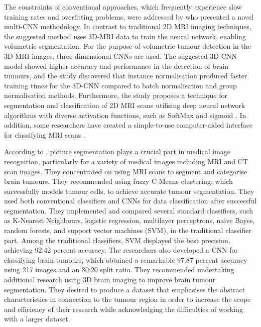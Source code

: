 \documentclass[12pt, a4paper,twoside]{report}
\theoremstyle{plain} %
\theoremstyle{definition} %
\theoremstyle{remark} %
\numberwithin{equation}{chapter}
\begin{document}
The constraints of conventional approaches, which frequently experience slow training rates and overfitting problems, were addressed by \cite{li19} who presented a novel multi-CNN methodology. In contrast to traditional 2D MRI imaging techniques, the suggested method uses 3D-MRI data to train the neural network, enabling volumetric segmentation. For the purpose of volumetric tumour detection in the 3D-MRI images, three-dimensional CNNs are used. The suggested 3D-CNN model showed higher accuracy and performance in the detection of brain tumours, and the study discovered that instance normalisation produced faster training times for the 3D-CNN compared to batch normalisation and group normalisation methods. Furthermore, the study proposes a technique for segmentation and classification of 2D MRI scans utilising deep neural network algorithms with diverse activation functions, such as SoftMax and sigmoid \cite{chattopadhyay22}. In addition, some researchers have created a simple-to-use computer-aided interface for classifying MRI scans \cite{ucuzal19}.

According to \cite{sobhaninia18}, picture segmentation plays a crucial part in medical image recognition, particularly for a variety of medical images including MRI and CT scan images. They concentrated on using MRI scans to segment and categorise brain tumours. They recommended using fuzzy C-Means clustering, which successfully models tumour cells, to achieve accurate tumour segmentation. They used both conventional classifiers and CNNs for data classification after successful segmentation. They implemented and compared several standard classifiers, such as K-Nearest Neighbours, logistic regression, multilayer perceptrons, naive Bayes, random forests, and support vector machines (SVM), in the traditional classifier part. Among the traditional classifiers, SVM displayed the best precision, achieving 92.42 percent accuracy. The researchers also developed a CNN for classifying brain tumours, which obtained a remarkable 97.87 percent accuracy using 217 images and an 80:20 split ratio. They recommended undertaking additional research using 3D brain imaging to improve brain tumour segmentation. They desired to produce a dataset that emphasises the abstract characteristics in connection to the tumour region in order to increase the scope and efficiency of their research while acknowledging the difficulties of working with a larger dataset.
\end{document}

